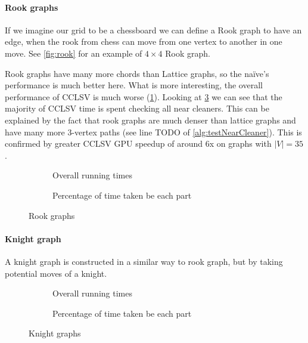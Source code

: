 \paragraph{Rook graphs}

If we imagine our grid to be a chessboard we can define a Rook graph to have an edge, when the rook from chess can move from one vertex to another in one move. See \cref{fig:rook} for an example of $4 \times 4$ Rook graph.

Rook graphs have many more chords than Lattice graphs, so the na\"ive's performance is much better here. What is more interesting, the overall performance of CCLSV is much worse (\cref{plot:rookLines}). Looking at \cref{plot:rookDet} we can see that the majority of CCLSV time is spent checking all near cleaners. This can be explained by the fact that rook graphs are much denser than lattice graphs and have many more 3-vertex paths (see line TODO of \cref{alg:testNearCleaner}). This is confirmed by greater CCLSV GPU speedup of around 6x on graphs with $|V| = 35$.

\begin{figure}
  \begin{subfigure}{\textwidth}
    \centering
    
    \caption{Overall running times}
    \label{plot:rookLines}
  \end{subfigure}

  \begin{subfigure}{\textwidth}
    \centering
    
    \caption{Percentage of time taken be each part}
    \label{plot:rookDet}
  \end{subfigure}
  \caption{Rook graphs}
\end{figure}

\paragraph{Knight graph}

A knight graph is constructed in a similar way to rook graph, but by taking potential moves of a knight.


\begin{figure}
  \begin{subfigure}{\textwidth}
    \centering
    
    \caption{Overall running times}
    \label{plot:knightLines}
  \end{subfigure}

  \begin{subfigure}{\textwidth}
    \centering
    
    \caption{Percentage of time taken be each part}
    \label{plot:knightDet}
  \end{subfigure}
  \caption{Knight graphs}
\end{figure}


